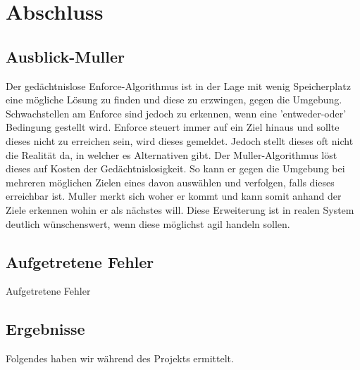 \section{Abschluss}

\subsection{Ausblick-Muller}
Der gedächtnislose Enforce-Algorithmus ist in der Lage mit wenig Speicherplatz eine mögliche Lösung zu finden und diese zu erzwingen, gegen die Umgebung. Schwachstellen am Enforce sind jedoch zu erkennen, wenn eine 'entweder-oder' Bedingung gestellt wird. Enforce steuert immer auf ein Ziel hinaus und sollte dieses nicht zu erreichen sein, wird dieses gemeldet. Jedoch stellt dieses oft nicht die Realität da, in welcher es Alternativen gibt. Der Muller-Algorithmus löst dieses auf Kosten der Gedächtnislosigkeit. So kann er gegen die Umgebung bei mehreren möglichen Zielen eines davon auswählen und verfolgen, falls dieses erreichbar ist. Muller merkt sich woher er kommt und kann somit anhand der Ziele erkennen wohin er als nächstes will. Diese Erweiterung ist in realen System deutlich wünschenswert, wenn diese möglichst agil handeln sollen.
\subsection{Aufgetretene Fehler}
Aufgetretene Fehler
\subsection{Ergebnisse}%
Folgendes haben wir während des Projekts ermittelt.%